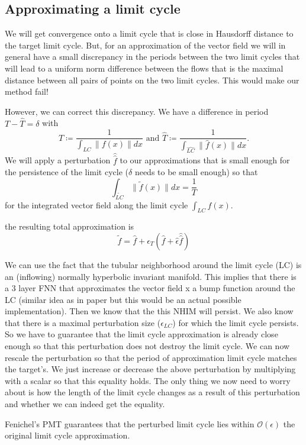 \documentclass{article}
\theoremstyle{definition}
\theoremstyle{remark}
\begin{document}
\subsection{Approximating a limit cycle}
We will get convergence onto a limit cycle that is close in Hausdorff distance to the target limit cycle. %
But, for an approximation of the vector field we will in general have a small discrepancy in the periods between the two limit cycles that will lead to a uniform norm difference between the flows that is the maximal distance between all pairs of points on the two limit cycles.
This would make our method fail!

However, we can correct this discrepancy.
We have a difference in period $T-\hat T = \delta$
with \[T\coloneqq\frac{1}{\int_{LC}\|f(x)\|dx} \text{ and } \hat T\coloneqq\frac{1}{\int_{\hat{LC}}\|\hat f(x)\|dx}.\]
%
We will apply a perturbation $\hat{\hat{f}}$ to our approximations that is small enough for the persistence of the limit cycle ($\delta$ needs to be small enough) 
so that 
\[\int_{\tilde{LC}}\|\tilde{f}(x)\| dx = \frac{1}{T}	\] for the integrated vector field along the limit cycle $\int_{LC}f(x)$.

the resulting total approximation is \[\tilde{f}=%
 \hat{f} + \epsilon_T(\hat{f} + \hat{\epsilon}\hat{\hat{f}})\]


We can use the fact that the tubular neighborhood around the limit cycle (LC) is an (inflowing) normally hyperbolic invariant manifold.
This implies that there is a 3 layer FNN that approximates the vector field x a bump function around the LC (similar idea as in paper but this would be an actual possible implementation).
Then we know that the this NHIM will persist.
We also know that there is a maximal perturbation size ($\epsilon_{LC}$) for which the limit cycle persists.
So we have to guarantee that the limit cycle approximation is already close enough so that this perturbation does not destroy the limit cycle.
We can now rescale the perturbation so that the period of approximation limit cycle matches the target's. 
We just increase or decrease  the above perturbation by multiplying with a scalar so that this equality holds.
The only thing we now need to worry about is how the length of the limit cycle changes as a result of this perturbation and whether we can indeed get the equality.

Fenichel's PMT guarantees that the perturbed limit cycle lies within $\mathcal{O}(\epsilon)$ the original limit cycle approximation.
\end{document}
